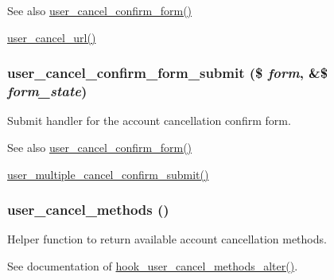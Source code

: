 \begin{DoxySeeAlso}{See also}
\hyperlink{group__forms_ga75a9df042449e7fc294c418083052114}{user\_\-cancel\_\-confirm\_\-form()} 

\hyperlink{user_8module_afdf3514e3f6d0c8de3f68ff5e98452c2}{user\_\-cancel\_\-url()} 
\end{DoxySeeAlso}
\hypertarget{user_8pages_8inc_a44992d6b5034c5e58010d46316368308}{
\subsubsection[{user\_\-cancel\_\-confirm\_\-form\_\-submit}]{\setlength{\rightskip}{0pt plus 5cm}user\_\-cancel\_\-confirm\_\-form\_\-submit (\$ {\em form}, \/  \&\$ {\em form\_\-state})}}
\label{user_8pages_8inc_a44992d6b5034c5e58010d46316368308}
Submit handler for the account cancellation confirm form.

\begin{DoxySeeAlso}{See also}
\hyperlink{group__forms_ga75a9df042449e7fc294c418083052114}{user\_\-cancel\_\-confirm\_\-form()} 

\hyperlink{user_8module_a7c21efb11cd202cddd82b3dc87fdd0a7}{user\_\-multiple\_\-cancel\_\-confirm\_\-submit()} 
\end{DoxySeeAlso}
\hypertarget{user_8pages_8inc_a11f0201b4e77086622c55fd3ed13bb93}{
\subsubsection[{user\_\-cancel\_\-methods}]{\setlength{\rightskip}{0pt plus 5cm}user\_\-cancel\_\-methods ()}}
\label{user_8pages_8inc_a11f0201b4e77086622c55fd3ed13bb93}
Helper function to return available account cancellation methods.

See documentation of \hyperlink{group__hooks_gadbac37235bb01361bf8b3d375ea417a5}{hook\_\-user\_\-cancel\_\-methods\_\-alter()}.

